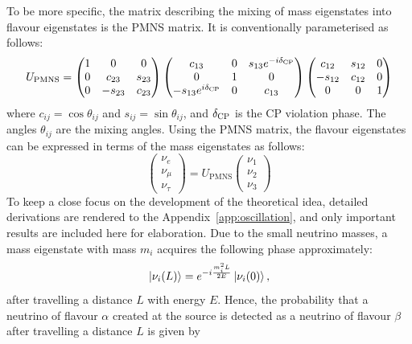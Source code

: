 To be more specific, the matrix describing the mixing of mass eigenstates into flavour eigenstates is the PMNS matrix.
It is conventionally parameterised as follows:
\begin{equation}
U_{\text{PMNS}} = 
\begin{pmatrix}
1 & 0 & 0 \\
0 & c_{23} & s_{23} \\
0 & -s_{23} & c_{23}
\end{pmatrix}
\begin{pmatrix}
c_{13} & 0 & s_{13} e^{-i\delta_\textrm{CP}} \\
0 & 1 & 0 \\
-s_{13} e^{i\delta_\textrm{CP}} & 0 & c_{13}
\end{pmatrix}
\begin{pmatrix}
c_{12} & s_{12} & 0 \\
-s_{12} & c_{12} & 0 \\
0 & 0 & 1
\end{pmatrix}
\end{equation}
where $c_{ij} = \cos\theta_{ij}$ and $s_{ij} = \sin\theta_{ij}$, and $\delta_\textrm{CP}$ is the CP violation phase.
The angles $\theta_{ij}$ are the mixing angles. 
Using the PMNS matrix, the flavour eigenstates can be expressed in terms of the mass eigenstates as follows:
\begin{equation}
\begin{pmatrix}
\nu_e \\
\nu_\mu \\
\nu_\tau
\end{pmatrix}
=
U_{\text{PMNS}}
\begin{pmatrix}
\nu_1 \\
\nu_2 \\
\nu_3
\end{pmatrix}
\end{equation}
To keep a close focus on the development of the theoretical idea, detailed derivations are rendered to the Appendix~\ref{app:oscillation}, and only important results are included here for elaboration.
Due to the small neutrino masses, a mass eigenstate with mass $m_i$ acquires the following phase approximately:
\begin{equation}
  \ket{\nu_i(L)} = e^{-i \frac{m_i^2 L}{2E}} \ket{\nu_i(0)},
\end{equation}
after travelling a distance $L$ with energy $E$.
Hence, the probability that a neutrino of flavour $\alpha$ created at the source is detected as a neutrino of flavour $\beta$ after travelling a distance $L$ is given by
